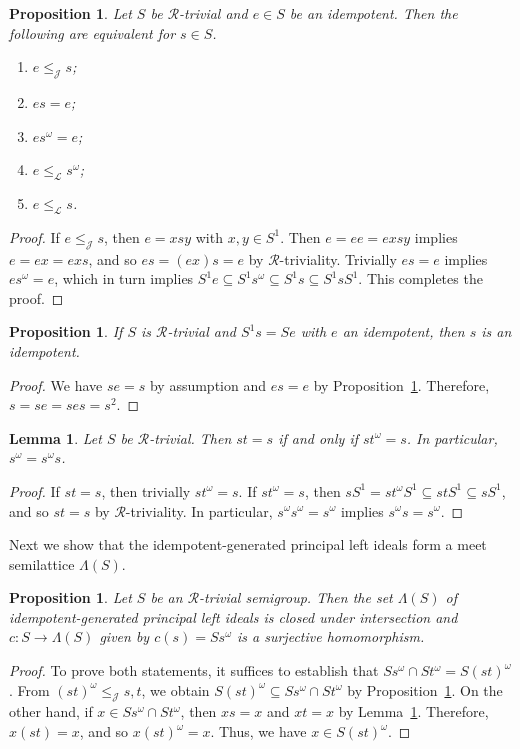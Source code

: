 \documentclass[reqno,11pt]{amsart}
\newcommand{\J}{\mathrel{\mathscr J}} %
\newcommand{\R}{\mathrel{\mathscr R}} %
\newcommand{\eL}{\mathrel{\mathscr L}} %
\newtheorem{Prop}[Thm]{Proposition}
\newtheorem{Lemma}[Thm]{Lemma}
{\theoremstyle{definition}
\newtheorem{Def}[Thm]{Definition}}
{\theoremstyle{remark}
\newtheorem{Rmk}[Thm]{Remark}}
\numberwithin{equation}{section}
\begin{document}
\begin{Prop}\label{p:J=L for idempotents}
   Let $S$ be $\mathscr R$-trivial and $e\in S$ be an idempotent.  Then the following are equivalent for $s\in S$.
   \begin{enumerate}
       \item $e\leq_{\J} s$;
       \item $es = e$;
       \item $es^{\omega}=e$;
       \item $e\leq_{\eL} s^{\omega}$;
       \item $e\leq_{\eL} s$.
   \end{enumerate}
\end{Prop}
\begin{proof}
    If $e\leq_{\J} s$, then $e=xsy$ with $x,y\in S^1$.  Then $e=ee=exsy$ implies $e=ex=exs$, and so $es= (ex)s=e$ by $\R$-triviality.  Trivially $es=e$ implies $es^{\omega}=e$, which in turn implies $S^1e\subseteq S^1s^{\omega}\subseteq S^1s\subseteq S^1sS^1$.  This completes the proof.
\end{proof}

\begin{Prop}\label{p:L.to.idem}
    If $S$ is $\mathscr R$-trivial and $S^1s=Se$ with $e$ an idempotent, then $s$ is an idempotent.
\end{Prop}
\begin{proof}
    We have $se=s$ by assumption and $es=e$ by Proposition~\ref{p:J=L for idempotents}.  Therefore, $s=se=ses=s^2$.
\end{proof}

  

\begin{Lemma}\label{l:stabilize}
Let $S$ be $\mathscr R$-trivial.  Then $st=s$ if and only if $st^\omega=s$.    In particular, $s^\omega=s^\omega s$.
\end{Lemma}
\begin{proof}
If $st=s$, then trivially $st^\omega=s$.  If $st^\omega =s$, then $sS^1=st^{\omega}S^1\subseteq stS^1\subseteq sS^1$, and so $st=s$ by $\mathscr R$-triviality.   In particular, $s^\omega s^\omega =s^\omega$ implies $s^\omega s=s^\omega$.
\end{proof}


Next we show that the idempotent-generated principal left ideals form a meet semilattice $\Lambda(S)$.

\begin{Prop}\label{p:meet.sml}
Let $S$ be an $\mathscr R$-trivial semigroup.  Then the set $\Lambda(S)$ of idempotent-generated principal left ideals is closed under intersection and $c\colon S\to \Lambda(S)$ given by $c(s)=Ss^{\omega}$ is a surjective homomorphism.
\end{Prop}
\begin{proof}
To prove both statements, it suffices to establish that $Ss^\omega\cap St^\omega = S(st)^\omega$.  From $(st)^\omega\leq_{\mathscr J}s,t$, we obtain $S(st)^\omega\subseteq Ss^\omega\cap St^\omega$ by Proposition~\ref{p:J=L for idempotents}.  On the other hand, if $x\in Ss^\omega\cap St^\omega$, then $xs=x$ and $xt=x$ by Lemma~\ref{l:stabilize}.  Therefore, $x(st)=x$, and so $x(st)^\omega = x$.  Thus, we have $x\in S(st)^\omega$.    
\end{proof}
\end{document}
